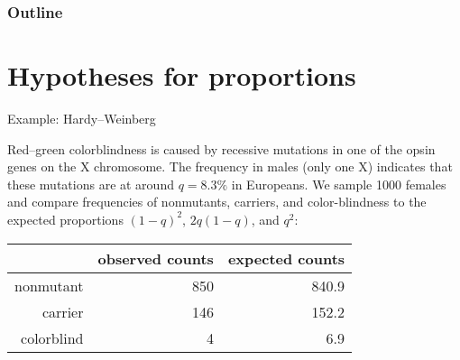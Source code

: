 %
%
%



\subtitle{the chi-squared statistic}

\date{12 November 2013}






\begin{frame}
  \maketitle
\end{frame}

\begin{frame}\frametitle<presentation>{Outline}
  \tableofcontents
\end{frame}


\section{Hypotheses for proportions}

\begin{frame}{Example: Hardy--Weinberg}

    Red--green colorblindness is caused by recessive mutations in one of the opsin genes on the X chromosome.
    The frequency in males (only one X) indicates that these mutations are at around $q=8.3\%$ in Europeans.
    We sample 1000 females and compare frequencies of nonmutants, carriers, and color-blindness to the expected proportions $(1-q)^2$, $2q(1-q)$, and $q^2$:
    \begin{center}
        \begin{tabular}{r|rr}
            & observed counts & expected counts \\
            \hline 
            nonmutant & 850 & 840.9 \\ 
            carrier &  146 & 152.2 \\ 
            colorblind & 4 & 6.9  
        \end{tabular}
    \end{center}

\end{frame}


